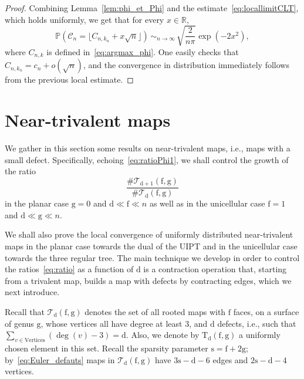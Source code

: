 \documentclass[11pt]{article}
\newcommand{\ie}{i.e.,\xspace}
\theoremstyle{plain}
\theoremstyle{definition}
\theoremstyle{remark}
\newcommand{\R}{\mathbb{R}}
\renewcommand{\P}{\mathbb{P}}
\newcommand{\Triv}{\mathrm{T}}
\newcommand{\face}{\mathrm{f}}
\newcommand{\defect}{\mathrm{d}}
\newcommand{\gen}{\mathrm{g}}
\newcommand{\spar}{\mathrm{s}}
\newcommand{\equi}[1][n]{\,\mathop{\sim}^{}_{#1 \to \infty}\,}
\begin{document}
\begin{proof}
Combining Lemma~\ref{lem:phi_et_Phi} and the estimate~\eqref{eq:locallimitCLT}, which holds uniformly,
we get that for every $x\in\R$,\vspace*{-3pt}
\[
\P(\mathcal{C}_{n}=\lfloor C_{n,k_{n}}+x\sqrt{n} \rfloor) \equi \sqrt{\frac{2}{n\pi}} \exp\left(-2 x^{2}\right),
\]
where $C_{n,k}$ is defined in~\eqref{eq:argmax_phi}. One easily checks that $C_{n,k_{n}} = c_n + o(\sqrt{n})$, and the convergence in distribution immediately follows from the previous local estimate.
\end{proof}

\section{Near-trivalent maps}
\label{sec:defauts_bis}

We gather in this section some results on near-trivalent maps, \ie maps with a small defect. Specifically, echoing~\eqref{eq:ratioPhi1}, we shall control the growth of the ratio\vspace*{-3pt}
\begin{equation}\label{eq:ratio}
\frac{\# \mathcal{T}_{\defect+1}(\face, \gen)}{ \# \mathcal{T}_{\defect}(\face, \gen)}
\end{equation}
in the planar case $\gen=0$ and $\defect \ll \face \ll n$ as well as in the unicellular case $\face=1$ and $\defect \ll \gen \ll n$.

We shall also prove the local convergence of uniformly distributed near-trivalent maps in the planar case towards the dual of the UIPT and in the unicellular case towards the three regular tree. The main technique we develop in order to control the ratios~\eqref{eq:ratio} as a function of $ \defect$ is a contraction operation that, starting from a trivalent map, builds a map with defects by contracting edges, which we next introduce.

Recall that $\mathcal{T}_{\defect}{(\face,\gen)}$ denotes the set of all rooted maps with $ \face$ faces, on a surface of genus $ \gen$, whose vertices all have degree at least $3$, and $\defect$ defects, \ie such that $\sum_{v \in \mathrm{Vertices}} (\deg(v)-3) = \defect$. Also, we denote by $\Triv_{ \defect}(\face,\gen)$ a uniformly chosen element in this set.
Recall the sparsity parameter $\spar=\face+2\gen$; by~\eqref{eq:Euler_defauts} maps in $\mathcal{T}_{\defect}{(\face,\gen)}$ have $3\spar-\defect-6$ edges and $2\spar-\defect-4$ vertices.
\end{document}
